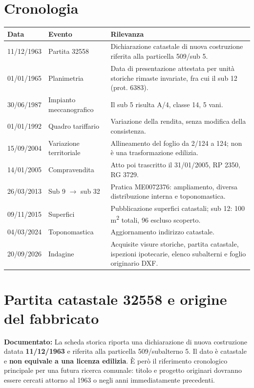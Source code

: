 \documentclass[11pt,a4paper]{article}
\newcommand{\docu}[1]{\textbf{\color{ok}Documentato:} #1}
\begin{document}
\section{Cronologia}
\begin{longtable}{p{2.5cm}p{3.8cm}p{8.3cm}}\toprule
\textbf{Data}&\textbf{Evento}&\textbf{Rilevanza}\\\midrule\endhead
11/12/1963 & Partita 32558 & Dichiarazione catastale di nuova costruzione riferita alla particella 509/sub 5.\\
01/01/1965 & Planimetria & Data di presentazione attestata per unità storiche rimaste invariate, fra cui il sub 12 (prot. 6383).\\
30/06/1987 & Impianto meccanografico & Il sub 5 risulta A/4, classe 14, 5 vani.\\
01/01/1992 & Quadro tariffario & Variazione della rendita, senza modifica della consistenza.\\
15/09/2004 & Variazione territoriale & Allineamento del foglio da 2/124 a 124; non è una trasformazione edilizia.\\
14/01/2005 & Compravendita & Atto poi trascritto il 31/01/2005, RP 2350, RG 3729.\\
26/03/2013 & Sub 9 $\to$ sub 32 & Pratica ME0072376: ampliamento, diversa distribuzione interna e toponomastica.\\
09/11/2015 & Superfici & Pubblicazione superfici catastali; sub 12: 100 m\textsuperscript{2} totali, 96 escluso scoperto.\\
04/03/2024 & Toponomastica & Aggiornamento indirizzo catastale.\\
20/09/2026 & Indagine & Acquisite visure storiche, partita catastale, ispezioni ipotecarie, elenco subalterni e foglio originario DXF.\\
\bottomrule\end{longtable}

\section{Partita catastale 32558 e origine del fabbricato}
\docu{La scheda storica riporta una dichiarazione di nuova costruzione datata \textbf{11/12/1963} e riferita alla particella 509/subalterno 5.}
Il dato è catastale e \textbf{non equivale a una licenza edilizia}. È però il riferimento cronologico principale per una futura ricerca comunale: titolo e progetto originari dovranno essere cercati attorno al 1963 o negli anni immediatamente precedenti.
\end{document}
